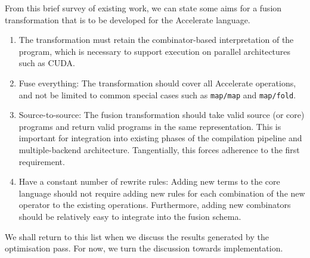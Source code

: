 From this brief survey of existing work, we can state some aims for a fusion
transformation that is to be developed for the Accelerate language.

\begin{enumerate}
    \item The transformation must retain the combinator-based interpretation of
        the program, which is necessary to support execution on parallel
        architectures such as CUDA.

    \item Fuse everything: The transformation should cover all Accelerate
        operations, and not be limited to common special cases such as
        \texttt{map/map} and \texttt{map/fold}.

    \item Source-to-source: The fusion transformation should take valid source
        (or core) programs and return valid programs in the same representation.
        This is important for integration into existing phases of the compilation
        pipeline and multiple-backend architecture. Tangentially, this forces
        adherence to the first requirement.

    \item Have a constant number of rewrite rules: Adding new terms to the core
        language should not require adding new rules for each combination of the
        new operator to the existing operations. Furthermore, adding new
        combinators should be relatively easy to integrate into the fusion
        schema.
\end{enumerate}

We shall return to this list when we discuss the results generated by the
optimisation pass. For now, we turn the discussion towards implementation.



% 
% 
% 
% 

